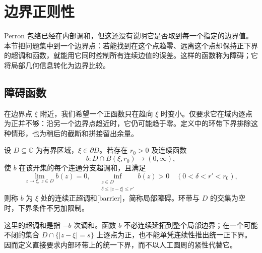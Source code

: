 \section{边界正则性}
\label{b3:sec:1603}

Perron 包络已经在内部调和，但这还没有说明它是否取到每一个指定的边界值。本节把问题集中到一个边界点：若能找到在这个点趋零、远离这个点却保持正下界的超调和函数，就能用它同时控制所有连续边值的误差。这样的函数称为障碍；它将局部几何信息转化为边界比较。

\subsection{障碍函数}
\label{b3:subsec:160301}

在边界点 \(\xi\) 附近，我们希望一个正函数只在趋向 \(\xi\) 时变小。仅要求它在域内逐点为正并不够：沿另一个边界点趋近时，它仍可能趋于零。定义中的环带下界排除这种情形，也为稍后的截断和拼接留出余量。

\begin{definition}\label{b3:def:16-barrier}
设 \(D\subseteq\mathbb C\) 为有界区域，\(\xi\in\partial D\)。若存在 \(r_0>0\) 及连续函数
\[
 b:D\cap B(\xi,r_0)\longrightarrow(0,\infty),
\]
使 \(b\) 在该开集的每个连通分支超调和，且满足
\[
 \lim_{z\to\xi,\ z\in D}b(z)=0,
 \quad
 \inf_{\substack{z\in D\\\delta\le|z-\xi|\le r'}}b(z)>0
 \quad(0<\delta<r'<r_0),
\]
则称 \(b\) 为 \(\xi\) 处的连续正超调和[barrier]，简称局部障碍。环带与 \(D\) 的交集为空时，下界条件不另加限制。
\end{definition}
这里的超调和是指 \(-b\) 次调和。函数 \(b\) 不必连续延拓到整个局部边界；在一个可能不闭的集合 \(D\cap\{|z-\xi|=s\}\) 上逐点为正，也不能单凭连续性推出统一正下界。因而定义直接要求内部环带上的统一下界，而不以人工圆周的紧性代替它。

